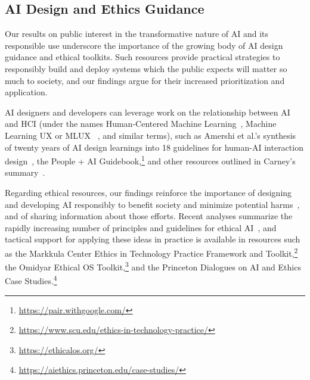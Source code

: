 \documentclass[sigconf]{acmart}
\begin{document}
\subsection{AI Design and Ethics Guidance}

Our results on public interest in the transformative nature of AI and its responsible use underscore the importance of the
growing body of AI design guidance and ethical toolkits.
Such resources provide practical strategies to responsibly build and deploy systems which the public expects will matter so much to society, and our findings argue for their increased prioritization and application.

AI designers and developers can leverage work on the relationship between AI and HCI (under the names Human-Centered Machine Learning~\cite{lovejoy2017}, Machine Learning UX or MLUX ~\cite{carney2019}, and similar terms), such as Amershi et al.'s synthesis of twenty years of AI design learnings into 18 guidelines for human-AI interaction design~\cite{amershi2019}, the People + AI Guidebook,\footnote{\url{https://pair.withgoogle.com/}} and other resources outlined in Carney's summary~\cite{carney2019}.

Regarding ethical resources, our findings reinforce the importance of designing and developing AI responsibly to benefit society and minimize potential harms~\cite{abrassart2018, highlevel2019}, and of sharing information about those efforts. Recent analyses summarize the rapidly increasing number of principles and guidelines for ethical AI~\cite{fjeld2020,jobin2019}, and tactical support for applying these ideas in practice is available in resources such as the Markkula Center Ethics in Technology Practice Framework and Toolkit,\footnote{\url{https://www.scu.edu/ethics-in-technology-practice/}} the Omidyar Ethical OS Toolkit,\footnote{\url{https://ethicalos.org/}} and the Princeton Dialogues on AI and Ethics Case Studies.\footnote{\url{https://aiethics.princeton.edu/case-studies/}}
\end{document}
